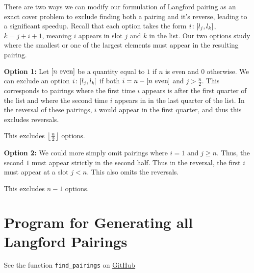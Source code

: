 \documentclass[letterpaper]{article}
\begin{document}
There are two ways we can modify our formulation of Langford pairing as an exact cover problem to exclude finding both a pairing and it's reverse, leading to a significant speedup.
Recall that each option takes the form $i\colon \bqty{l_{j}, l_{k}}$, $k = j + i + 1$, meaning $i$ appears in slot $j$ and $k$ in the list.
Our two options study where the smallest or one of the largest elements must appear in the resulting pairing.

\textbf{Option 1:}
Let $\bqty{n \text{ even}}$ be a quantity equal to $1$ if $n$ is even and $0$ otherwise.
We can exclude an option $i\colon \bqty{l_{j}, l_{k}}$ if both $i = n - \bqty{n \text{ even}}$ and $j > \frac{n}{2}$.
This corresponds to pairings where the first time $i$ appears is after the first quarter of the list and where the second time $i$ appears in in the last quarter of the list.
In the reversal of these pairings, $i$ would appear in the first quarter, and thus this excludes reversals.

This excludes $\left\lfloor \frac{n}{2} \right\rfloor$ options.

\textbf{Option 2:}
We could more simply omit pairings where $i = 1$ and $j \geq n$.
Thus, the second $1$ must appear strictly in the second half.
Thus in the reversal, the first $i$ must appear at a slot $j < n$.
This also omits the reversals.

This excludes $n - 1$ options.

\section*{Program for Generating all Langford Pairings}

See the function \texttt{find\_pairings} on \href{https://github.com/SIGma-UIUC/meetings/blob/main/SP23/3-langford/langford_pairing.py}{GitHub}

\printbibliography
\end{document}
